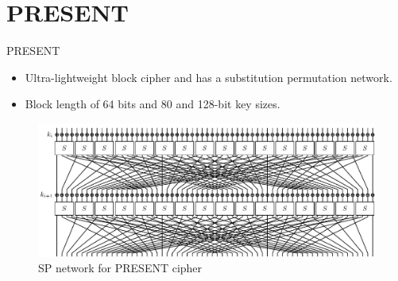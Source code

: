 \section{PRESENT}

\begin{frame}{PRESENT}
\begin{itemize}
    \item Ultra-lightweight block cipher and has a substitution permutation network.
    \pause
    \item Block length of 64 bits and 80 and 128-bit key sizes.
\end{itemize}
\begin{figure}[h!]
    \centering
    \includegraphics[width=\linewidth]{present/PRESENT_diagram.pdf}
    \caption{SP network for PRESENT cipher \cite{presentdiagram}}
    \label{fig:spp}
\end{figure}
\end{frame}
